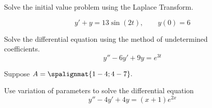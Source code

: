 \documentclass[12pt]{exam}
\begin{document}
\begin{questions}



    \newpage  	
 	
    \question[10] Solve the initial value problem using the Laplace Transform. 
    
    $$y' + y = 13\sin(2t),  \qquad y(0) = 6$$

    
    \newpage 
    
    \question[8] Solve the differential equation using the method of undetermined \\coefficients. $$y'' - 6y' + 9y = e^{3t}$$
    
   
    \newpage
    
    \question[10] Suppose $A =\spalignmat{1 -4;4 -7}.$  %
 	
    
    \newpage 

    \question[12] Use variation of parameters to solve the differential equation $$y'' - 4y' + 4y = (x+1)e^{2x}$$
    

    
\end{questions}
\end{document}
